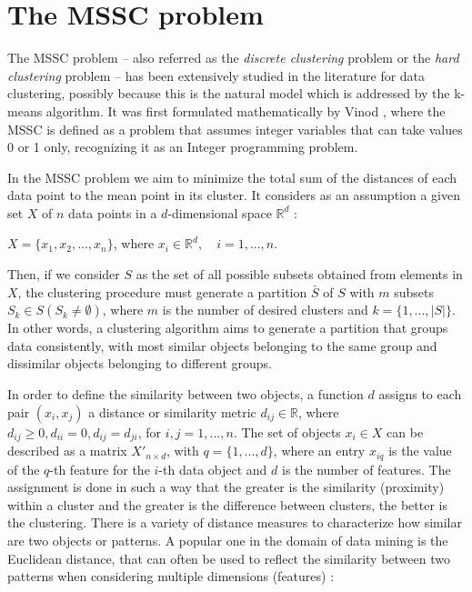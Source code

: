 \section{The MSSC problem}
The MSSC problem -- also referred as the \textit{discrete clustering} problem or the \textit{hard clustering} problem -- has been extensively studied in the literature for data clustering, possibly because this is the natural model which is addressed by the k-means algorithm. It was first formulated mathematically by Vinod \cite{Vinod1969}, where the MSSC is defined as a problem that assumes integer variables that can take values 0 or 1 only, recognizing it as an Integer programming problem.

In the MSSC problem we aim to minimize the total sum of the distances of each data point to the mean point in its cluster. It considers as an assumption a given set $X$ of $n$ data points in a $d$-dimensional space $\mathbb{R}^d$ \cite{Bagirov2006}:

\begin{center}%
$X = \{x_1, x_2, ..., x_n\}$, where $x_i \in \mathbb{R}^d, \quad i = 1, ..., n.$
\end{center}

Then, if we consider $S$ as the set of all possible subsets obtained from elements in $X$, the clustering procedure must generate a partition $\bar{S}$ of $S$ with $m$ subsets $S_k \in S (S_k \neq \emptyset)$, where $m$ is the number of desired clusters and $k = \{1,...,\left | S \right |\}$. In other words, a clustering algorithm aims to generate a partition that groups data consistently, with most similar objects belonging to the same group and dissimilar objects belonging to different groups.

In order to define the similarity between two objects, a function $d$ assigns to each pair $(x_i, x_j)$ a distance or similarity metric $d_{ij} \in \mathbb{R}$, where $d_{ij} \geq 0, d_{ii} = 0, d_{ij} = d_{ji}$, for $i, j = 1, ... ,n$. The set of objects $x_i \in X$ can be described as a matrix $X'_{n \times d}$, with $q = \{1,...,d\}$, where an entry $x_{iq}$ is the value of the $q$-th feature for the $i$-th data object and $d$ is the number of features. The assignment is done in such a way that the greater is the similarity (proximity) within a cluster and the greater is the difference between clusters, the better is the clustering. There is a variety of distance measures to characterize how similar are two objects or patterns. A popular one in the domain of data mining is the Euclidean distance, that can often be used to reflect the similarity between two patterns when considering multiple dimensions (features) \cite{Jain1999}:

